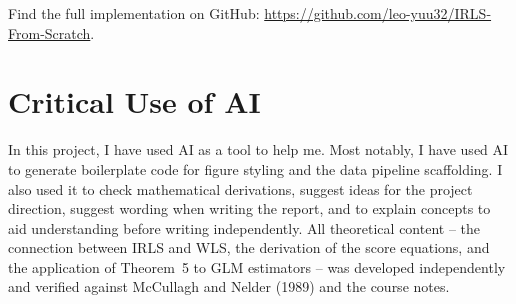 \documentclass[11pt]{article}
\begin{document}
\noindent Find the full implementation on GitHub: \url{https://github.com/leo-yuu32/IRLS-From-Scratch}.

\section{Critical Use of AI}

In this project, I have used AI as a tool to help me. Most notably, I have used AI
to generate boilerplate code for figure styling and the data pipeline scaffolding.
I also used it to check mathematical derivations, suggest ideas for the project
direction, suggest wording when writing the report, and to explain concepts to aid
understanding before writing independently. All theoretical content -- the connection
between IRLS and WLS, the derivation of the score equations, and the application
of Theorem~5 to GLM estimators -- was developed independently and verified against
McCullagh and Nelder (1989) and the course notes.
\end{document}
